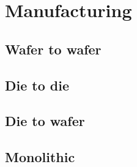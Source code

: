 \documentclass[12pt,a4paper]{article}
\theoremstyle{customdef}
\begin{document}


\section{Manufacturing}

\subsection{Wafer to wafer}

\subsection{Die to die}

\subsection{Die to wafer}

\subsection{Monolithic}





\end{document}
